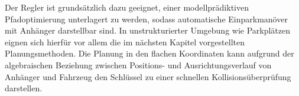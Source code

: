 Der Regler ist grundsätzlich dazu geeignet, einer modellprädiktiven Pfadoptimierung unterlagert  zu werden, sodass automatische Einparkmanöver mit Anhänger darstellbar sind. %
In unstrukturierter Umgebung wie Parkplätzen eignen sich hierfür vor allem die im nächsten Kapitel vorgestellten Planungsmethoden. Die Planung in den flachen Koordinaten \cite{rouchon1993flatness1} kann aufgrund der algebraischen Beziehung zwischen Positions- und Ausrichtungsverlauf von Anhänger und Fahrzeug den Schlüssel zu einer schnellen Kollisionsüberprüfung \cite{zieglerfastcollision2010} darstellen.
 

	

